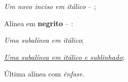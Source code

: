 \begin{alineas}
  \begin{incisos}
    \item \textit{Um novo inciso em itálico} -- \showfont;
  \end{incisos}

  \item Alínea em \textbf{negrito} -- \showfont:

  \begin{subalineas}
    \item \textit{Uma subalínea em itálico};
    \item \underline{\textit{Uma subalínea em itálico e sublinhado}};
  \end{subalineas}

  \item Última alínea com \emph{ênfase}.

\end{alineas}
